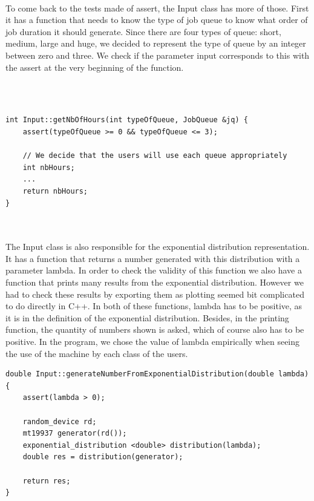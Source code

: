 \documentclass [10 pt, a4 paper]{report}
\begin{document}
\noindent
\\ 
To come back to the tests made of assert, the Input class has more of those. First it has a function that needs to know the type of job queue to know what order of job duration it should generate. Since there are four types of queue: short, medium, large and huge, we decided to represent the type of queue by an integer between zero and three. We check if the parameter input corresponds to this with the assert at the very beginning of the function.

\\ \\

\begin{lstlisting}[caption=getNbOfHours function of the class Input, label={lst:code1}, frame=single]
int Input::getNbOfHours(int typeOfQueue, JobQueue &jq) {
	assert(typeOfQueue >= 0 && typeOfQueue <= 3);

	// We decide that the users will use each queue appropriately
	int nbHours;
	...
	return nbHours;
}
\end{lstlisting}

\noindent
\\ \\
The Input class is also responsible for the exponential distribution representation. It has a function that returns a number generated with this distribution with a parameter lambda. In order to check the validity of this function we also have a function that prints many results from the exponential distribution. However we had to check these results by exporting them as plotting seemed  bit complicated to do directly in C++. In both of these functions, lambda has to be positive, as it is in the definition of the exponential distribution. Besides, in the printing function, the quantity of numbers shown is asked, which of course also has to be positive. In the program, we chose the value of lambda empirically when seeing the use of the machine by each class of the users.



\begin{lstlisting}[caption=generateNumberFromExponentialDistribution function of the class Input, label={lst:code1}, frame=single]
double Input::generateNumberFromExponentialDistribution(double lambda) {
	assert(lambda > 0);

	random_device rd;
	mt19937 generator(rd());
	exponential_distribution <double> distribution(lambda);
	double res = distribution(generator);

	return res;
}
\end{lstlisting}
\end{document}
